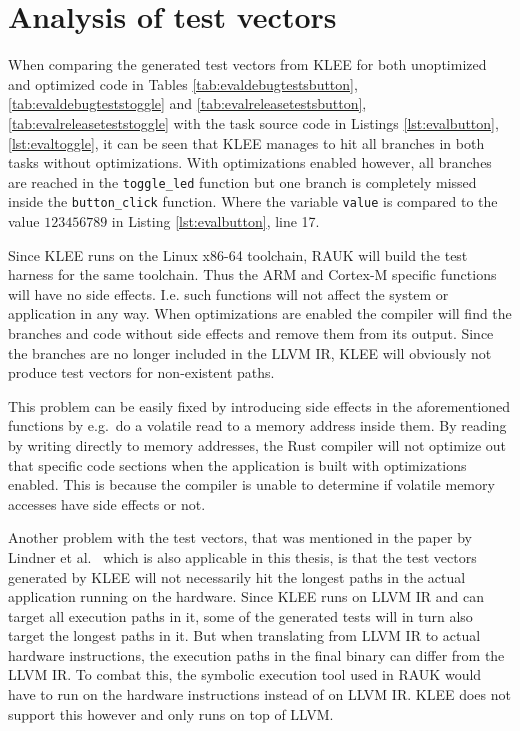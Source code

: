 
\section{Analysis of test vectors}
When comparing the generated test vectors from KLEE for both unoptimized and
optimized code in Tables \ref{tab:evaldebugtestsbutton},
\ref{tab:evaldebugteststoggle} and \ref{tab:evalreleasetestsbutton},
\ref{tab:evalreleaseteststoggle} with the task source code in Listings
\ref{lst:evalbutton}, \ref{lst:evaltoggle}, it can be seen that KLEE manages to
hit all branches in both tasks without optimizations. With optimizations
enabled however, all branches are reached in the \texttt{toggle\_led} function
but one branch is completely missed inside the \texttt{button\_click} function.
Where the variable \texttt{value} is compared to the value $123456789$ in
Listing \ref{lst:evalbutton}, line 17.

Since KLEE runs on the Linux x86-64 toolchain, RAUK will build the test harness
for the same toolchain. Thus the ARM and Cortex-M specific functions will have
no side effects. I.e. such functions will not affect the system or application
in any way. When optimizations are enabled the compiler will find the branches
and code without side effects and remove them from its output. Since the
branches are no longer included in the LLVM IR, KLEE will obviously not
produce test vectors for non-existent paths.

This problem can be easily fixed by introducing side effects in the
aforementioned functions by e.g.\ do a volatile read to a memory address
inside them. By reading by writing directly to memory addresses, the Rust
compiler will not optimize out that specific code sections when the application
is built with optimizations enabled. This is because the compiler is unable to
determine if volatile memory accesses have side effects or not.

Another problem with the test vectors, that was mentioned in the paper by
Lindner et al.\ \cite{lindner} which is also applicable in this thesis, is that
the test vectors generated by KLEE will not necessarily hit the longest paths
in the actual application running on the hardware. Since KLEE runs on LLVM IR
and can target all execution paths in it, some of the generated tests will
in turn also target the longest paths in it. But when translating from LLVM
IR to actual hardware instructions, the execution paths in the final binary
can differ from the LLVM IR. To combat this, the symbolic execution tool used in
RAUK would have to run on the hardware instructions instead of on LLVM IR. KLEE
does not support this however and only runs on top of LLVM.

